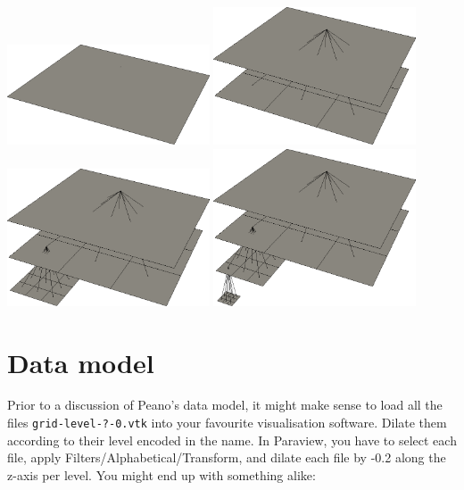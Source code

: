 \begin{center}
  \includegraphics[width=0.45\textwidth]{11_basics/construction00.png}
  \includegraphics[width=0.45\textwidth]{11_basics/construction01.png}
  \includegraphics[width=0.45\textwidth]{11_basics/construction02.png}
  \includegraphics[width=0.45\textwidth]{11_basics/construction03.png}
\end{center}

% 
% 



\section{Data model}
Prior to a discussion of Peano's data model, it might make sense to load all the
files \texttt{grid-level-?-0.vtk} into your favourite visualisation software.
Dilate them according to their level encoded in the name.
In Paraview, you have to select each file, apply
Filters/Alphabetical/Transform, and dilate each file by -0.2 along the z-axis
per level.
You might end up with something alike:



